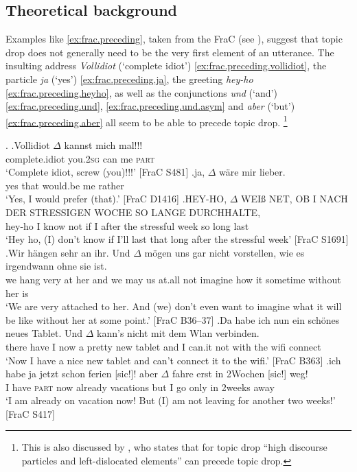 \subsection{Theoretical background}\label{sec:intial.theory}
Examples like \ref{ex:frac.preceding}, taken from the FraC  (see ), suggest that topic drop does not generally need to be the very first element of an utterance.
The insulting address \textit{Vollidiot} (`complete idiot') \ref{ex:frac.preceding.vollidiot}, the particle \textit{ja} (`yes') \ref{ex:frac.preceding.ja}, the greeting \textit{hey-ho} \ref{ex:frac.preceding.heyho}, as well as the conjunctions  \textit{und} (`and') \ref{ex:frac.preceding.und}, \ref{ex:frac.preceding.und.asym} and \textit{aber} (`but') \ref{ex:frac.preceding.aber} all seem to be able to precede topic drop.%
\footnote{This is also discussed by \citet[287]{sigurdsson2011}, who states that for topic drop ``high discourse particles and left-dislocated  elements'' can precede topic drop.}
%

\ex.\label{ex:frac.preceding}
\ag.\label{ex:frac.preceding.vollidiot}Vollidiot $\Delta$ kannst mich mal!!! \\
complete.idiot you.\textsc{2sg} can me \textsc{part}\\
`Complete idiot, screw (you)!!!' [FraC S481]
\bg.\label{ex:frac.preceding.ja}ja, $\Delta$ wäre mir lieber.\\
yes that would.be me rather\\
`Yes, I would prefer (that).' [FraC D1416]
\cg.\label{ex:frac.preceding.heyho}HEY-HO, $\Delta$ WEIß NET, OB I NACH DER STRESSIGEN WOCHE SO LANGE DURCHHALTE,\\
hey-ho I know not if I after the stressful week so long last\\
`Hey ho, (I) don't know if I'll last that long after the stressful week' [FraC S1691]
\dg.\label{ex:frac.preceding.und}Wir hängen sehr an ihr. Und $\Delta$ mögen uns gar nicht vorstellen, wie es irgendwann ohne sie ist.\\
we hang very at her and we may us at.all not imagine how it sometime without her is\\
`We are very attached to her. And (we) don't even want to imagine what it will be like without her at some point.' [FraC B36--37]
\eg.\label{ex:frac.preceding.und.asym}Da habe ich nun ein schönes neues Tablet. Und $\Delta$ kann's nicht mit dem Wlan verbinden. \\
there have I now a pretty new tablet and I can.it not with the wifi connect \\
`Now I have a nice new tablet and can't connect it to the wifi.' [FraC B363]
\fg.\label{ex:frac.preceding.aber}ich habe ja jetzt schon {ferien [sic!]!} aber $\Delta$ fahre erst in {2Wochen [sic!]} weg!  \\
I have \textsc{part} now already vacations  but I go only in 2weeks away\\
`I am already on vacation now! But (I) am not leaving for another two weeks!' [FraC S417]

